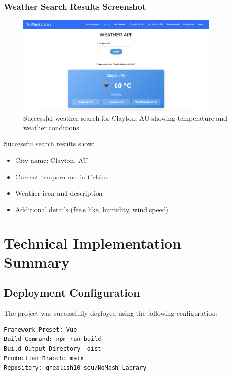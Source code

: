 \documentclass[12pt,a4paper]{article}
\begin{document}
\subsubsection{Weather Search Results Screenshot}

\begin{figure}[H]
\centering
\includegraphics[width=0.9\textwidth]{clayton_weather_search.png}
\caption{Successful weather search for Clayton, AU showing temperature and weather conditions}
\end{figure}

Successful search results show:
\begin{itemize}
\item City name: Clayton, AU
\item Current temperature in Celsius
\item Weather icon and description
\item Additional details (feels like, humidity, wind speed)
\end{itemize}

\newpage

\section{Technical Implementation Summary}

\subsection{Deployment Configuration}

The project was successfully deployed using the following configuration:

\begin{lstlisting}
Framework Preset: Vue
Build Command: npm run build
Build Output Directory: dist
Production Branch: main
Repository: grealish10-seu/NoMash-Labrary
\end{lstlisting}
\end{document}
